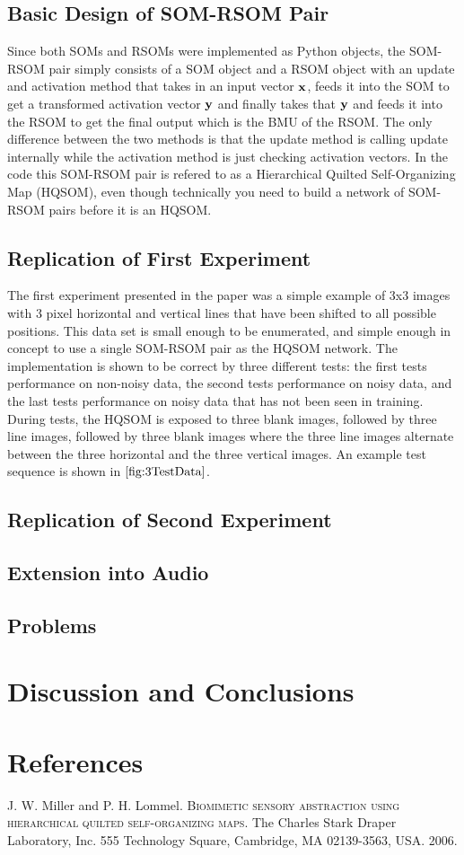 \documentclass[a4paper,10pt]{article}
\begin{document}
\subsection{Basic Design of SOM-RSOM Pair}
Since both SOMs and RSOMs were implemented as Python objects, the SOM-RSOM pair simply consists of
a SOM object and a RSOM object with an update and activation method that takes in an input vector
$\bold{x}$, feeds it into the SOM to get a transformed activation vector $\bold{y}$ and finally
takes that $\bold{y}$ and feeds it into the RSOM to get the final output which is the BMU of the
RSOM.  The only difference between the two methods is that the update method is calling update
internally while the activation method is just checking activation vectors.  In the code this
SOM-RSOM pair is refered to as a Hierarchical Quilted Self-Organizing Map (HQSOM), even though
technically you need to build a network of SOM-RSOM pairs before it is an HQSOM.
\subsection{Replication of First Experiment}
The first experiment presented in the paper was a simple example of 3x3 images with 3
pixel horizontal and vertical lines that have been shifted to all possible positions.  This data
set is small enough to be enumerated, and simple enough in concept to use a single SOM-RSOM pair as
the HQSOM network.  The implementation is shown to be correct by three different tests: the first
tests performance on non-noisy data, the second tests performance on noisy data, and the last tests
performance on noisy data that has not been seen in training.  During tests, the HQSOM is exposed
to three blank images, followed by three line images, followed by three blank images where the
three line images alternate between the three horizontal and the three vertical images.  An example
test sequence is shown in $\ref{fig:3TestData}$.


\subsection{Replication of Second Experiment}
\subsection{Extension into Audio}
\subsection{Problems}
\section{Discussion and Conclusions}
\section{References}

\begin{thebibliography}{}
 J. W. Miller and P. H. Lommel. \textsc{Biomimetic sensory abstraction using
hierarchical quilted self-organizing maps}. The Charles Stark Draper Laboratory, Inc.
555 Technology Square, Cambridge, MA 02139-3563, USA. 2006.
\end{thebibliography}
\end{document}
